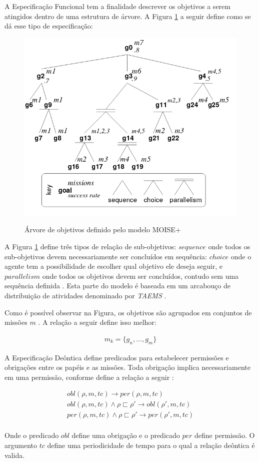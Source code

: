 A Especificação Funcional tem a finalidade descrever os objetivos a serem atingidos dentro de uma estrutura de árvore. A Figura \ref{arvoremoise} a seguir define como se dá esse tipo de especificação: 

\begin{figure}[H]
  \centering
  \caption{Árvore de objetivos definido pelo modelo MOISE+}
  \includegraphics[width=0.8\linewidth]{figure/figmoise} 
  \begin{center}
  	\cite{moiseframework}
  \end{center}
  \label{arvoremoise}
\end{figure}

A Figura \ref{arvoremoise} define três tipos de relação de sub-objetivos: $sequence$ onde todos os sub-objetivos devem necessariamente ser concluídos em sequência: $choice$ onde o agente tem a possibilidade de escolher qual objetivo ele deseja seguir, e $parallelism$ onde todos os objetivos devem ser concluídos, contudo sem uma sequência definida \cite{taems01,taems02}. Esta parte do modelo é baseada em um arcabouço de distribuição de atividades denominado por \textit{TAEMS} \cite{TAEMS}. 

Como é possível observar na Figura, os objetivos são agrupados em conjuntos de missões $m$ \cite{dynamicagenttemporalstruct}. A relação a seguir define isso melhor:

\begin{eqnarray}
	m_k = \{ g_n,...,g_m\}
\end{eqnarray}


A Especificação Deôntica define predicados para estabelecer permissões e obrigações entre os papéis e as missões. Toda obrigação implica necessariamente em uma permissão, conforme define a relação a seguir \cite{moiseframework,deonticOne}: 

\begin{eqnarray}\nonumber \label{deonticRuleMoise}
	obl(\rho,m,tc) \to per(\rho,m,tc) \\
	obl(\rho,m,tc) \wedge \rho \sqsubset \rho' \to obl(\rho',m,tc) \\
	per(\rho,m,tc) \wedge \rho \sqsubset \rho' \to per(\rho',m,tc) \\	
\end{eqnarray}

Onde o predicado $obl$ define uma obrigação e o predicado $per$ define permissão. O argumento $tc$ define uma periodicidade de tempo para o qual a relação deôntica é valida. 